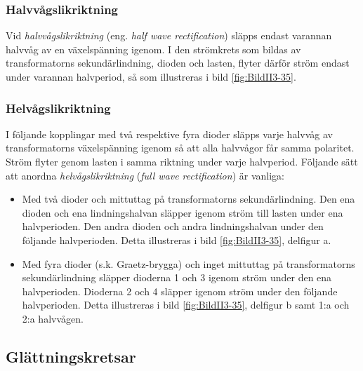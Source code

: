 
\subsubsection{Halvvågslikriktning}

Vid \emph{halvvågslikriktning} (eng. \emph{half wave rectification}) släpps endast
varannan halvvåg av en växelspänning igenom.
I den strömkrets som bildas av transformatorns sekundärlindning, dioden och
lasten, flyter därför ström endast under varannan halvperiod, så som
illustreras i bild \ref{fig:BildII3-35}.

\subsubsection{Helvågslikriktning}

I följande kopplingar med två respektive fyra dioder släpps varje halvvåg av
transformatorns växelspänning igenom så att alla halvvågor får samma polaritet.
Ström flyter genom lasten i samma riktning under varje halvperiod.
Följande sätt att anordna \emph{helvågslikriktning}
(\emph{full wave rectification}) är vanliga:
\begin{itemize}
\item Med två dioder och mittuttag på transformatorns sekundärlindning.
  Den ena dioden och ena lindningshalvan släpper igenom ström till lasten
  under ena halvperioden.
  Den andra dioden och andra lindningshalvan under den följande halvperioden.
  Detta illustreras i bild \ref{fig:BildII3-35}, delfigur a.

\item Med fyra dioder (s.k. Graetz-brygga) och inget mittuttag på
  transformatorns sekundärlindning släpper dioderna 1 och 3 igenom
  ström under den ena halvperioden.
  Dioderna 2 och 4 släpper igenom ström under den följande halvperioden.
  Detta illustreras i bild \ref{fig:BildII3-35}, delfigur b samt 1:a och 2:a
  halvvågen.
\end{itemize}

\newpage %
\subsection{Glättningskretsar}
\label{glättningskretsar}

